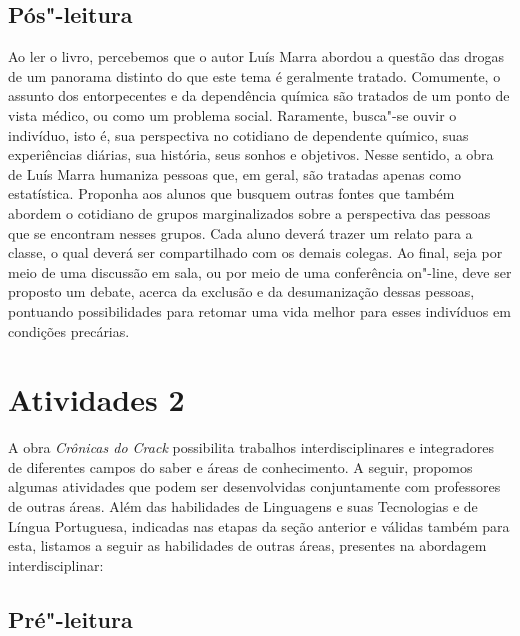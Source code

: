 \documentclass{article}
\begin{document}
\subsection{Pós"-leitura}


Ao ler o livro, percebemos que o autor Luís Marra abordou a
questão das drogas de um panorama distinto do que este tema é geralmente
tratado. Comumente, o assunto dos entorpecentes e da dependência química
são tratados de um ponto de vista médico, ou como um problema social.
Raramente, busca"-se ouvir o indivíduo, isto é, sua perspectiva no
cotidiano de dependente químico, suas experiências diárias, sua
história, seus sonhos e objetivos. Nesse sentido, a obra de Luís Marra
humaniza pessoas que, em geral, são tratadas apenas como estatística.
Proponha aos alunos que busquem outras fontes que também abordem o
cotidiano de grupos marginalizados sobre a perspectiva das pessoas que
se encontram nesses grupos. Cada aluno deverá trazer um relato para a
classe, o qual deverá ser compartilhado com os demais colegas. Ao final,
seja por meio de uma discussão em sala, ou por meio de uma conferência
on"-line, deve ser proposto um debate, acerca da exclusão e da
desumanização dessas pessoas, pontuando possibilidades para retomar uma
vida melhor para esses indivíduos em condições precárias.

\section{Atividades 2}


A obra \emph{Crônicas do Crack} possibilita trabalhos interdisciplinares
e integradores de diferentes campos do saber e áreas de conhecimento. A
seguir, propomos algumas atividades que podem ser desenvolvidas
conjuntamente com professores de outras áreas. Além das habilidades de
Linguagens e suas Tecnologias e de Língua Portuguesa, indicadas nas
etapas da seção anterior e válidas também para esta, listamos a seguir
as habilidades de outras áreas, presentes na abordagem interdisciplinar:

\subsection{Pré"-leitura}
\end{document}
